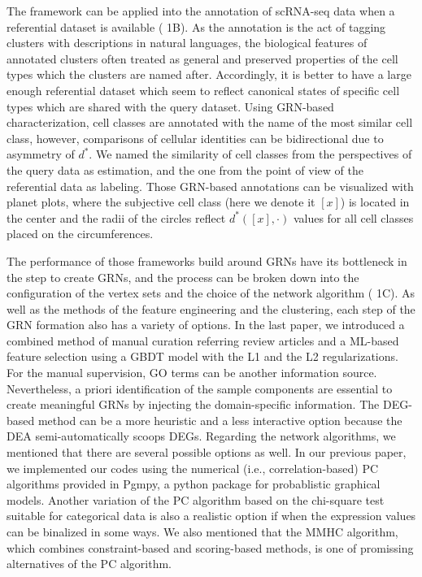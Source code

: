 \documentclass{article}
\begin{document}
The framework can be applied into the annotation of scRNA-seq data when a referential dataset is available 
(\figurename{ 1B}). As the annotation is the act of tagging clusters with descriptions in natural languages, the biological 
features of annotated clusters often treated as general and preserved properties of the cell types which the clusters 
are named after. Accordingly, it is better to have a large enough referential dataset which seem to reflect canonical 
states of specific cell types which are shared with the query dataset. Using GRN-based characterization, cell classes 
are annotated with the name of the most similar cell class, however, comparisons of cellular identities can be 
bidirectional due to asymmetry of $d^*$. We named the similarity of cell classes from the perspectives of the query 
data as estimation, and the one from the point of view of the referential data as labeling. Those GRN-based 
annotations can be visualized with planet plots, where the subjective cell class (here we denote it $[x]$) is located in 
the center and the radii of the circles reflect $d^*([x],\cdot)$ values for all cell classes placed on the circumferences.

The performance of those frameworks build around GRNs have its bottleneck in the step to create GRNs, and 
the process can be broken down into the configuration of the vertex sets and the choice of the network algorithm 
(\figurename{ 1C}). As well as the methods of the feature engineering and the clustering, each step of the GRN formation 
also has a variety of options. In the last paper, we introduced a combined method of manual curation referring 
review articles and a \ac{ML}-based feature selection using a \ac{GBDT} 
model with the L1 and the L2 regularizations\cite{okano2023set}. For the manual supervision, \ac{GO} terms can be 
another information source. Nevertheless, a priori identification of the sample components are essential to create 
meaningful GRNs by injecting the domain-specific information. The \ac{DEG}-based 
method can be a more heuristic and a less interactive option because the \ac{DEA} 
semi-automatically scoops DEGs. Regarding the network algorithms, we mentioned that there are several possible 
options as well. In our previous paper, we implemented our codes using the numerical (i.e., correlation-based) PC 
algorithms provided in Pgmpy\cite{pgmpy}, a python package for probablistic graphical models. Another variation of the PC 
algorithm based on the chi-square test suitable for categorical data is also a realistic option if when the expression 
values can be binalized in some ways. We also mentioned that the \ac{MMHC} algorithm, which 
combines constraint-based and scoring-based methods\cite{tsamardinos2006max}, is one of promissing alternatives of the PC algorithm.
\end{document}
